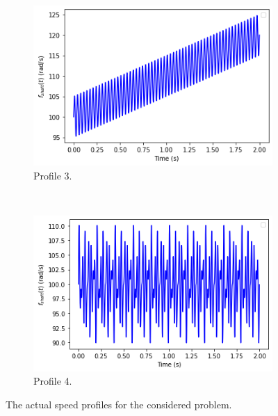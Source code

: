 \documentclass{article}
\begin{document}
\begin{figure}[htb!]
		\begin{subfigure}[b]{0.45\textwidth}
			\centering
			\includegraphics[width=\textwidth]{Q4_f3_1.png}
			\caption{Profile 3.}
		\end{subfigure}
		~
		\begin{subfigure}[b]{0.45\textwidth}
			\centering
			\includegraphics[width=\textwidth]{Q4_f4_1.png}
			\caption{Profile 4.}
		\end{subfigure}
	
		\caption{The actual speed profiles for the considered problem.}
		\label{fig:Q4_profiles}
	\end{figure}
\end{document}
